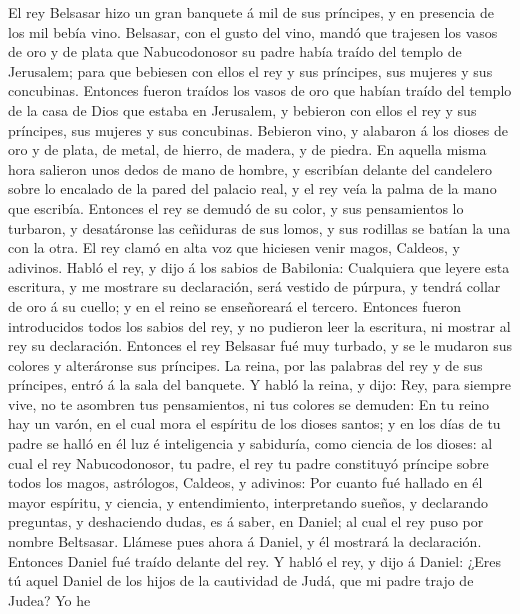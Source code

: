  El rey Belsasar hizo un gran banquete á mil de sus
príncipes, y en presencia de los mil bebía vino.  Belsasar,
con el gusto del vino, mandó que trajesen los vasos de oro y de plata
que Nabucodonosor su padre había traído del templo de Jerusalem; para
que bebiesen con ellos el rey y sus príncipes, sus mujeres y sus
concubinas.  Entonces fueron traídos los vasos de oro que
habían traído del templo de la casa de Dios que estaba en Jerusalem, y
bebieron con ellos el rey y sus príncipes, sus mujeres y sus concubinas.
 Bebieron vino, y alabaron á los dioses de oro y de plata,
de metal, de hierro, de madera, y de piedra.  En aquella
misma hora salieron unos dedos de mano de hombre, y escribían delante
del candelero sobre lo encalado de la pared del palacio real, y el rey
veía la palma de la mano que escribía.  Entonces el rey se
demudó de su color, y sus pensamientos lo turbaron, y desatáronse las
ceñiduras de sus lomos, y sus rodillas se batían la una con la otra.
 El rey clamó en alta voz que hiciesen venir magos, Caldeos,
y adivinos. Habló el rey, y dijo á los sabios de Babilonia: Cualquiera
que leyere esta escritura, y me mostrare su declaración, será vestido de
púrpura, y tendrá collar de oro á su cuello; y en el reino se
enseñoreará el tercero.  Entonces fueron introducidos todos
los sabios del rey, y no pudieron leer la escritura, ni mostrar al rey
su declaración.  Entonces el rey Belsasar fué muy turbado, y
se le mudaron sus colores y alteráronse sus príncipes.  La
reina, por las palabras del rey y de sus príncipes, entró á la sala del
banquete. Y habló la reina, y dijo: Rey, para siempre vive, no te
asombren tus pensamientos, ni tus colores se demuden:  En
tu reino hay un varón, en el cual mora el espíritu de los dioses santos;
y en los días de tu padre se halló en él luz é inteligencia y sabiduría,
como ciencia de los dioses: al cual el rey Nabucodonosor, tu padre, el
rey tu padre constituyó príncipe sobre todos los magos, astrólogos,
Caldeos, y adivinos:  Por cuanto fué hallado en él mayor
espíritu, y ciencia, y entendimiento, interpretando sueños, y declarando
preguntas, y deshaciendo dudas, es á saber, en Daniel; al cual el rey
puso por nombre Beltsasar. Llámese pues ahora á Daniel, y él mostrará la
declaración.  Entonces Daniel fué traído delante del rey. Y
habló el rey, y dijo á Daniel: ¿Eres tú aquel Daniel de los hijos de la
cautividad de Judá, que mi padre trajo de Judea?  Yo he
